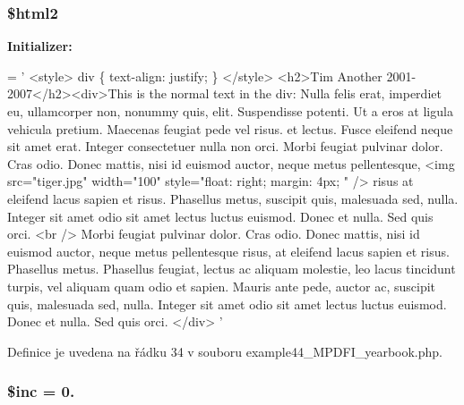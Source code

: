 \hypertarget{example44___m_p_d_f_i__yearbook_8php_ae7ad61c940688f9490c82954465360bb}{
\subsubsection[{\$html2}]{\setlength{\rightskip}{0pt plus 5cm}\$html2}}\label{example44___m_p_d_f_i__yearbook_8php_ae7ad61c940688f9490c82954465360bb}
{\bfseries Initializer\-:}
\begin{DoxyCode}
= \textcolor{stringliteral}{'}
\textcolor{stringliteral}{<style>}
\textcolor{stringliteral}{div \{ text-align: justify; \}}
\textcolor{stringliteral}{</style>}
\textcolor{stringliteral}{<h2>Tim Another 2001-2007</h2><div>This is the normal text in the div: Nulla felis erat, imperdiet eu,
       ullamcorper non, nonummy quis, elit. Suspendisse potenti. Ut a eros at ligula vehicula pretium. Maecenas feugiat
       pede vel risus. et lectus. Fusce eleifend neque sit amet erat. Integer consectetuer nulla non orci. Morbi
       feugiat pulvinar dolor. Cras odio. Donec mattis, nisi id euismod auctor, neque metus pellentesque, <img
       src="tiger.jpg" width="100" style="float: right; margin: 4px; " /> risus at eleifend lacus sapien et risus.
       Phasellus metus, suscipit quis, malesuada sed, nulla. Integer sit amet odio sit amet lectus luctus euismod. Donec
       et nulla. Sed quis orci.  <br />}
\textcolor{stringliteral}{Morbi feugiat pulvinar dolor. Cras odio. Donec mattis, nisi id euismod auctor, neque metus pellentesque
       risus, at eleifend lacus sapien et risus. Phasellus metus. Phasellus feugiat, lectus ac aliquam molestie, leo
       lacus tincidunt turpis, vel aliquam quam odio et sapien. Mauris ante pede, auctor ac, suscipit quis,
       malesuada sed, nulla. Integer sit amet odio sit amet lectus luctus euismod. Donec et nulla. Sed quis orci. </div>}
\textcolor{stringliteral}{'}
\end{DoxyCode}


Definice je uvedena na řádku 34 v souboru example44\-\_\-\-M\-P\-D\-F\-I\-\_\-yearbook.\-php.

\hypertarget{example44___m_p_d_f_i__yearbook_8php_ae62114b42bccd4bae6db688c72000802}{
\subsubsection[{\$inc}]{\setlength{\rightskip}{0pt plus 5cm}\$inc = 0.}}\label{example44___m_p_d_f_i__yearbook_8php_ae62114b42bccd4bae6db688c72000802}



